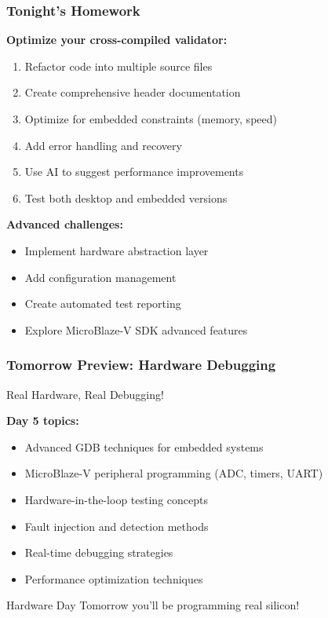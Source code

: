 \documentclass{beamer}
\begin{document}
\begin{frame}
\frametitle{Tonight's Homework}
\textbf{Optimize your cross-compiled validator:}
\begin{enumerate}
    \item Refactor code into multiple source files
    \item Create comprehensive header documentation
    \item Optimize for embedded constraints (memory, speed)
    \item Add error handling and recovery
    \item Use AI to suggest performance improvements
    \item Test both desktop and embedded versions
\end{enumerate}

\vspace{0.5cm}
\textbf{Advanced challenges:}
\begin{itemize}
    \item Implement hardware abstraction layer
    \item Add configuration management
    \item Create automated test reporting
    \item Explore MicroBlaze-V SDK advanced features
\end{itemize}
\end{frame}

\begin{frame}
\frametitle{Tomorrow Preview: Hardware Debugging}
\begin{center}
\Large Real Hardware, Real Debugging!
\end{center}

\textbf{Day 5 topics:}
\begin{itemize}
    \item Advanced GDB techniques for embedded systems
    \item MicroBlaze-V peripheral programming (ADC, timers, UART)
    \item Hardware-in-the-loop testing concepts
    \item Fault injection and detection methods
    \item Real-time debugging strategies
    \item Performance optimization techniques
\end{itemize}

\vspace{0.5cm}
\begin{alertblock}{Hardware Day}
Tomorrow you'll be programming real silicon!
\end{alertblock}
\end{frame}
\end{document}
